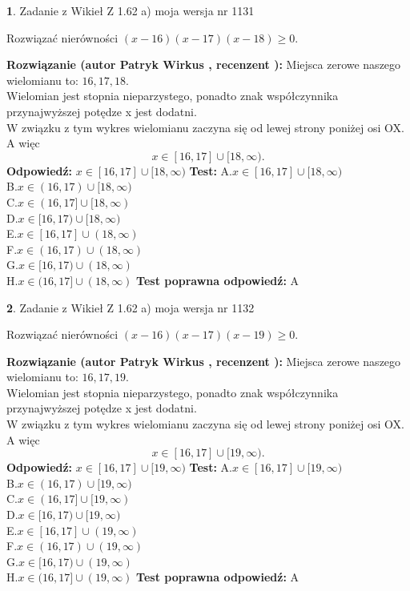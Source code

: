 \documentclass[12pt, a4paper]{article}
\theoremstyle{definition} %
\newtheorem{zad}{}
\newcommand{\zadStart}[1]{\begin{zad}#1\newline}
\newcommand{\zadStop}{\end{zad}}
\newcommand{\rozwStart}[2]{\noindent \textbf{Rozwiązanie (autor #1 , recenzent #2): }\newline}
\newcommand{\rozwStop}{\newline}
\newcommand{\odpStart}{\noindent \textbf{Odpowiedź:}\newline}
\newcommand{\odpStop}{\newline}
\newcommand{\testStart}{\noindent \textbf{Test:}\newline}
\newcommand{\testStop}{\newline}
\newcommand{\kluczStart}{\noindent \textbf{Test poprawna odpowiedź:}\newline}
\newcommand{\kluczStop}{\newline}
\begin{document}
\zadStart{Zadanie z Wikieł Z 1.62 a) moja wersja nr 1131}

Rozwiązać nierówności $(x-16)(x-17)(x-18)\ge0$.
\zadStop
\rozwStart{Patryk Wirkus}{}
Miejsca zerowe naszego wielomianu to: $16, 17, 18$.\\
Wielomian jest stopnia nieparzystego, ponadto znak współczynnika przy\linebreak najwyższej potędze x jest dodatni.\\ W związku z tym wykres wielomianu zaczyna się od lewej strony poniżej osi OX. A więc $$x \in [16,17] \cup [18,\infty).$$
\rozwStop
\odpStart
$x \in [16,17] \cup [18,\infty)$
\odpStop
\testStart
A.$x \in [16,17] \cup [18,\infty)$\\
B.$x \in (16,17) \cup [18,\infty)$\\
C.$x \in (16,17] \cup [18,\infty)$\\
D.$x \in [16,17) \cup [18,\infty)$\\
E.$x \in [16,17] \cup (18,\infty)$\\
F.$x \in (16,17) \cup (18,\infty)$\\
G.$x \in [16,17) \cup (18,\infty)$\\
H.$x \in (16,17] \cup (18,\infty)$
\testStop
\kluczStart
A
\kluczStop



\zadStart{Zadanie z Wikieł Z 1.62 a) moja wersja nr 1132}

Rozwiązać nierówności $(x-16)(x-17)(x-19)\ge0$.
\zadStop
\rozwStart{Patryk Wirkus}{}
Miejsca zerowe naszego wielomianu to: $16, 17, 19$.\\
Wielomian jest stopnia nieparzystego, ponadto znak współczynnika przy\linebreak najwyższej potędze x jest dodatni.\\ W związku z tym wykres wielomianu zaczyna się od lewej strony poniżej osi OX. A więc $$x \in [16,17] \cup [19,\infty).$$
\rozwStop
\odpStart
$x \in [16,17] \cup [19,\infty)$
\odpStop
\testStart
A.$x \in [16,17] \cup [19,\infty)$\\
B.$x \in (16,17) \cup [19,\infty)$\\
C.$x \in (16,17] \cup [19,\infty)$\\
D.$x \in [16,17) \cup [19,\infty)$\\
E.$x \in [16,17] \cup (19,\infty)$\\
F.$x \in (16,17) \cup (19,\infty)$\\
G.$x \in [16,17) \cup (19,\infty)$\\
H.$x \in (16,17] \cup (19,\infty)$
\testStop
\kluczStart
A
\kluczStop
\end{document}
